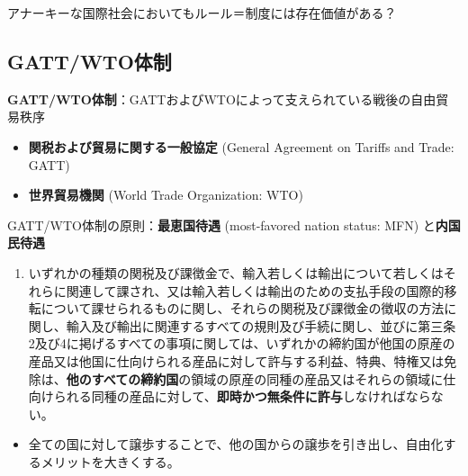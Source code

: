 \documentclass[
  xelatex,
  ja=standard]{bxjsarticle}
\providecommand{\tightlist}{%
  \setlength{\itemsep}{0pt}\setlength{\parskip}{0pt}}\usepackage{longtable,booktabs,array}
\begin{document}
アナーキーな国際社会においてもルール＝制度には存在価値がある？

\hypertarget{gattwtoux4f53ux5236}{%
\subsection{GATT/WTO体制}\label{gattwtoux4f53ux5236}}

\textbf{GATT/WTO体制}：GATTおよびWTOによって支えられている戦後の自由貿易秩序

\begin{itemize}
\tightlist
\item
  \textbf{関税および貿易に関する一般協定} (General Agreement on Tariffs
  and Trade: GATT)
\item
  \textbf{世界貿易機関} (World Trade Organization: WTO)
\end{itemize}

GATT/WTO体制の原則：\textbf{最恵国待遇} (most-favored nation status:
MFN) と\textbf{内国民待遇}

\begin{tcolorbox}[enhanced jigsaw, toprule=.15mm, leftrule=.75mm, coltitle=black, opacityback=0, colback=white, title=\textcolor{quarto-callout-note-color}{\faInfo}\hspace{0.5em}{\href{https://www.mofa.go.jp/mofaj/ecm/it/page1w_000136.html}{関税及び貿易に関する一般協定}　第1条}, rightrule=.15mm, bottomrule=.15mm, colbacktitle=quarto-callout-note-color!10!white, opacitybacktitle=0.6, titlerule=0mm, colframe=quarto-callout-note-color-frame, bottomtitle=1mm, toptitle=1mm, arc=.35mm, left=2mm, breakable]

\begin{enumerate}
\def\labelenumi{\arabic{enumi}.}
\tightlist
\item
  いずれかの種類の関税及び課徴金で、輸入若しくは輸出について若しくはそれらに関連して課され、又は輸入若しくは輸出のための支払手段の国際的移転について課せられるものに関し、それらの関税及び課徴金の徴収の方法に関し、輸入及び輸出に関連するすべての規則及び手続に関し、並びに第三条2及び4に掲げるすべての事項に関しては、いずれかの締約国が他国の原産の産品又は他国に仕向けられる産品に対して許与する利益、特典、特権又は免除は、\textbf{他のすべての締約国}の領域の原産の同種の産品又はそれらの領域に仕向けられる同種の産品に対して、\textbf{即時かつ無条件に許与}しなければならない。
\end{enumerate}

\end{tcolorbox}

\begin{itemize}
\tightlist
\item
  全ての国に対して譲歩することで、他の国からの譲歩を引き出し、自由化するメリットを大きくする。
\end{itemize}
\end{document}
